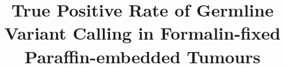 \documentclass{bmcart}
\begin{document}
\begin{frontmatter}

\begin{fmbox}


\title{True Positive Rate of Germline Variant Calling in Formalin-fixed Paraffin-embedded Tumours}


\author[
   addressref={aff1},                   %
   email={eyap@bcgsc.ca}   %
]{ }
\author[
   addressref={aff1,aff2},
	 corref={aff1},                       %
   email={akarsan@bcgsc.ca}
]{ }


\address[id=aff1]{%
  , %
  ,                     %
  ,                           %
}
\address[id=aff2]{%
  ,
  ,
  ,
}


\end{fmbox}
\end{frontmatter}
\end{document}
